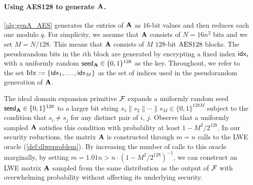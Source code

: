 \documentclass{iacrcc}
\begin{document}
\paragraph{Using AES128 to generate $\mathbf{A}$.}
\autoref{alg:genA_AES} generates the entries of $\mathbf{A}$ as $16$-bit values and then reduces each one modulo $q$. For simplicity, we assume that $\mathbf{A}$ consists of  $N=16n^2$ bits 
and we set $M = N/128$. This means that $\mathbf{A}$ consists of $M$ $128$-bit
$\textrm{\upshape\mdseries AES128}$ blocks. The pseudorandom bits in the $i$th block are
generated by encrypting a fixed index $\mathsf{idx}_i$ with a uniformly random ${\mathsf{seed}_{\mathbf{A}}}\in \{0,1\}^{128}$ as the key. Throughout, we refer to the set $\mathrm{Idx} := \left\{\mathsf{idx}_1,\ldots, \mathsf{idx}_M\right\}$ as the set of indices used in the pseudorandom generation of $\mathbf{A}$.

The ideal domain expansion primitive $\mathcal{F}$ expands a uniformly random seed
${\mathsf{seed}_{\mathbf{A}}} \in \{0,1\}^{128}$ to a larger bit string $s_1 \| s_2 \| \cdots \|
s_M \in \{0, 1\}^{128M}$ subject to the condition that $s_i \neq s_j$ for any
distinct pair of $i$, $j$. Observe that a uniformly sampled $\mathbf{A}$ satisfies
this condition with probability at least $1-M^2/2^{128}$. In our security
reductions, the matrix $\mathbf{A}$ is constructed through $m = n$ calls to the LWE
oracle (\autoref{def:dlweproblem}). By increasing the number of calls to this
oracle marginally, by setting $m = 1.01n > n \cdot (1-M^2/2^{128})^{-1}$, we
can construct an LWE matrix $\mathbf{A}$ sampled from the same distribution as the
output of $\mathcal{F}$ with overwhelming probability without affecting its
underlying security.
\medskip
\end{document}
